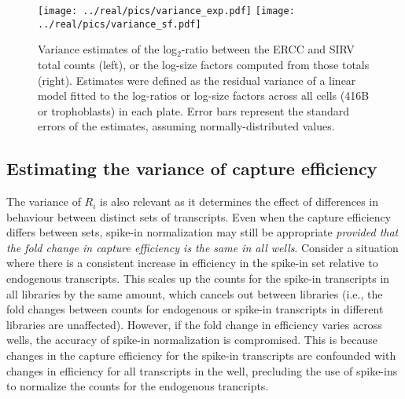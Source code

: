 \documentclass{article}
\begin{document}
\begin{figure}[btp]
    \begin{center}
        \texttt{[image: ../real/pics/variance\_exp.pdf]}
        \texttt{[image: ../real/pics/variance\_sf.pdf]}
    \end{center}
    \caption{Variance estimates of the log$_2$-ratio between the ERCC and SIRV total counts (left), or the log-size factors computed from those totals (right).
        Estimates were defined as the residual variance of a linear model fitted to the log-ratios or log-size factors across all cells (416B or trophoblasts) in each plate.
        Error bars represent the standard errors of the estimates, assuming normally-distributed values.
    }
    \label{fig:varestimates}
\end{figure}

\subsection{Estimating the variance of capture efficiency}
The variance of $R_i$ is also relevant as it determines the effect of differences in behaviour between distinct sets of transcripts.
Even when the capture efficiency differs between sets, spike-in normalization may still be appropriate \textit{provided that the fold change in capture efficiency is the same in all wells}.
Consider a situation where there is a consistent increase in efficiency in the spike-in set relative to endogenous transcripts.
This scales up the counts for the spike-in transcripts in all libraries by the same amount, which cancels out between libraries (i.e., the fold changes between counts for endogenous or spike-in transcripts in different libraries are unaffected).
However, if the fold change in efficiency varies across wells, the accuracy of spike-in normalization is compromised.
This is because changes in the capture efficiency for the spike-in transcripts are confounded with changes in efficiency for all transcripts in the well, precluding the use of spike-ins to normalize the counts for the endogenous trancripts.
\end{document}
